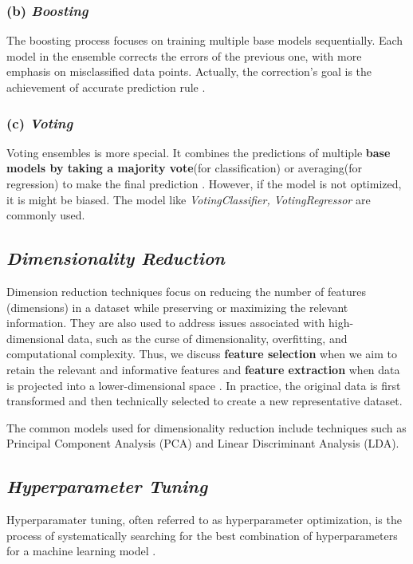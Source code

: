 \documentclass[12pt,a4paper, oneside]{book}
\begin{document}
\subsubsection{(b) \textit{Boosting}} 
The boosting process focuses on training multiple base models sequentially. Each model in the ensemble corrects the errors of the previous one, with more emphasis on misclassified data points. Actually, the correction's goal is the achievement of accurate prediction rule \citep{praveena2017literature}.

\subsubsection{(c) \textit{Voting}} 
Voting ensembles is more special. It combines the predictions of multiple \textbf{base models by taking a majority vote}(for classification) or averaging(for regression) to make the final prediction \citep{kabari2019comparison}. However, if the model is not optimized, it is might be biased. The model like \textit{VotingClassifier, VotingRegressor} are commonly used. 
\subsection*{\textit{Dimensionality Reduction}}
Dimension reduction techniques focus on reducing the number of features (dimensions) in a dataset while preserving or maximizing the relevant information. They are also used to address issues associated with high-dimensional data, such as the curse of dimensionality, overfitting, and computational complexity. Thus, we discuss \textbf{feature selection} when we aim to retain the relevant and informative features and \textbf{feature extraction} when data is projected into a lower-dimensional space \cite{cunningham2008dimension}. In practice, the original data is first transformed and then technically selected to create a new representative dataset. 

The common models used for dimensionality reduction include techniques such as Principal Component Analysis (PCA) and Linear Discriminant Analysis (LDA).
\subsection*{\textit{Hyperparameter Tuning}} 
Hyperparamater tuning, often referred to as hyperparameter optimization, is the process of systematically searching for the best combination of hyperparameters for a machine learning model  \citep{chauhan2020detection}.\\
\end{document}
